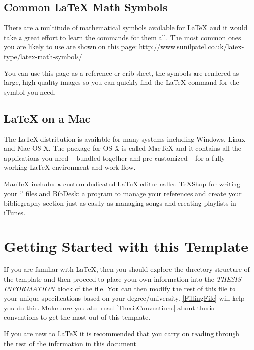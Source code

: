 \subsection{Common \LaTeX{} Math Symbols}
There are a multitude of mathematical symbols available for \LaTeX{} and it would take a great effort to learn the commands for them all. The most common ones you are likely to use are shown on this page: \url{http://www.sunilpatel.co.uk/latex-type/latex-math-symbols/}

You can use this page as a reference or crib sheet, the symbols are rendered as large, high quality images so you can quickly find the \LaTeX{} command for the symbol you need.

\subsection{\LaTeX{} on a Mac}
 
The \LaTeX{} distribution is available for many systems including Windows, Linux and Mac OS X.
The package for OS X is called MacTeX and it contains all the applications you need -- bundled together and pre-customized -- for a fully working \LaTeX{} environment and work flow.
 
MacTeX includes a custom dedicated \LaTeX{} editor called TeXShop for writing your `' files and BibDesk: a program to manage your references and create your bibliography section just as easily as managing songs and creating playlists in iTunes.


\section{Getting Started with this Template}

If you are familiar with \LaTeX{}, then you should explore the directory structure of the template and then proceed to place your own information into the \emph{THESIS INFORMATION} block of the  file.
You can then modify the rest of this file to your unique specifications based on your degree/university.
\cref{FillingFile} will help you do this. Make sure you also read \cref{ThesisConventions} about thesis conventions to get the most out of this template.

If you are new to \LaTeX{} it is recommended that you carry on reading through the rest of the information in this document.


